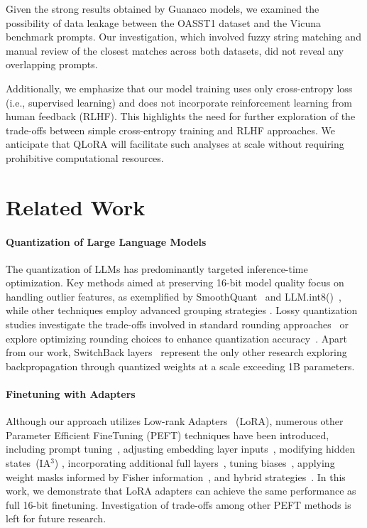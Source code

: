 Given the strong results obtained by {Guanaco} models, we examined the possibility of data leakage between the OASST1 dataset and the Vicuna benchmark prompts. Our investigation, which involved fuzzy string matching and manual review of the closest matches across both datasets, did not reveal any overlapping prompts.

Additionally, we emphasize that our model training uses only cross-entropy loss (i.e., supervised learning) and does not incorporate reinforcement learning from human feedback (RLHF). This highlights the need for further exploration of the trade-offs between simple cross-entropy training and RLHF approaches. We anticipate that \textsc{QLoRA} will facilitate such analyses at scale without requiring prohibitive computational resources.

\section{Related Work}

\paragraph{Quantization of Large Language Models} The quantization of LLMs has predominantly targeted inference-time optimization. Key methods aimed at preserving 16-bit model quality focus on handling outlier features, as exemplified by SmoothQuant~\citep{xiao2022smoothquant} and LLM.int8()~\citep{dettmers2022llm}, while other techniques employ advanced grouping strategies \citep{park2022nuqmm, yao2022zeroquant}. Lossy quantization studies investigate the trade-offs involved in standard rounding approaches~\citep{dettmers2022case,zeng2022glm,pope2022efficiently} or explore optimizing rounding choices to enhance quantization accuracy~\citep{frantar2022gptq}. Apart from our work, SwitchBack layers~\citep{wortsman2023stable} represent the only other research exploring backpropagation through quantized weights at a scale exceeding 1B parameters.

\paragraph{Finetuning with Adapters} Although our approach utilizes Low-rank Adapters~\citep{hu2021lora} (LoRA), numerous other Parameter Efficient FineTuning (PEFT) techniques have been introduced, including prompt tuning~\citep{qin2021learning,lester2021power,li2021prefix}, adjusting embedding layer inputs~\citep{an2022input}, modifying hidden states~(IA$^3$) \citep{liu2022few}, incorporating additional full layers~\citep{houlsby2019parameter}, tuning biases~\citep{zaken2021bitfit}, applying weight masks informed by Fisher information~\citep{sung2021training}, and hybrid strategies~\citep{henderson2021compacter}. In this work, we demonstrate that LoRA adapters can achieve the same performance as full 16-bit finetuning. Investigation of trade-offs among other PEFT methods is left for future research.

